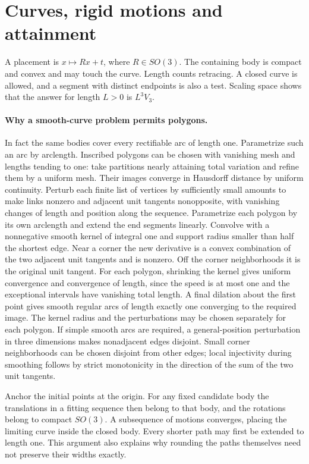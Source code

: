 \documentclass[11pt,letterpaper]{article}
\begin{document}
\section{Curves, rigid motions and attainment}\label{sec:setting}
A placement is $x\mapsto Rx+t$, where $R\in SO(3)$. The containing body
is compact and convex and may touch the curve. Length counts retracing.
A closed curve is allowed, and a segment with distinct endpoints is also
a test. Scaling space shows that the answer for length $L>0$ is $L^3V_3$.

\paragraph{Why a smooth-curve problem permits polygons.}
In fact the same bodies cover every rectifiable arc of length one.
Parametrize such an arc by arclength. Inscribed polygons can be chosen
with vanishing mesh and lengths tending to one: take partitions nearly
attaining total variation and refine them by a uniform mesh. Their images
converge in Hausdorff distance by uniform continuity. Perturb each finite
list of vertices by sufficiently small amounts to make links nonzero
and adjacent unit tangents nonopposite, with vanishing changes of length
and position along the sequence. Parametrize each polygon by its own
arclength and extend the end segments linearly. Convolve with a
nonnegative smooth kernel of integral one and support radius smaller than
half the shortest edge. Near a corner the new derivative is a convex
combination of the two adjacent unit tangents and is nonzero. Off the
corner neighborhoods it is the original unit tangent. For each polygon,
shrinking the kernel gives uniform convergence and convergence of length,
since the speed is at most one and the exceptional intervals have
vanishing total length. A final dilation about the first point gives
smooth regular arcs of length exactly one converging to the required
image. The kernel radius and the perturbations may be chosen separately
for each polygon. If simple smooth arcs are required, a general-position
perturbation in three dimensions makes nonadjacent edges disjoint.
Small corner neighborhoods can be chosen disjoint from other edges;
local injectivity during smoothing follows by strict monotonicity in
the direction of the sum of the two unit tangents.

Anchor the initial points at the origin. For any fixed candidate body
the translations in a fitting sequence then belong to that body, and
the rotations belong to compact $SO(3)$. A subsequence of motions
converges, placing the limiting curve inside the closed body. Every
shorter path may first be extended to length one. This argument also
explains why rounding the paths themselves need not preserve their
widths exactly.
\end{document}
